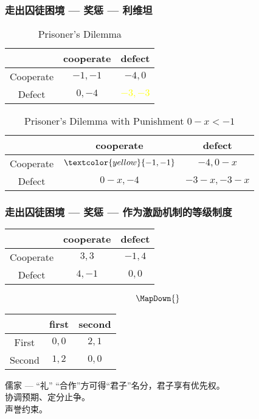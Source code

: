 \documentclass[UTF8,11pt,colorlinks,compress,openany]{beamer}%
\begin{document}
\begin{frame}\frametitle{走出囚徒困境 --- 奖惩 --- 利维坦}
\begin{table}
\abovetabulinesep=1mm
\belowtabulinesep=1mm
\begin{tabu}{c|cc}
\hline
 & cooperate & defect\\
\hline
Cooperate & $-1,-1$ & $-4,0$\\
Defect & $0,-4$ &\textcolor{yellow}{$-3,-3$}\\
\hline
\end{tabu}\caption{Prisoner's Dilemma}
\end{table}
\begin{table}
\abovetabulinesep=1mm
\belowtabulinesep=1mm
\begin{tabu}{c|cc}
\hline
 & cooperate & defect\\
\hline
Cooperate & $\textcolor{yellow}{-1,-1}$ & $-4,0-x$\\
Defect & $0-x,-4$ &$-3-x,-3-x$\\
\hline
\end{tabu}\caption{Prisoner's Dilemma with Punishment $0-x<-1$}
\end{table}	
\end{frame}

\begin{frame}\frametitle{走出囚徒困境 --- 奖惩 --- 作为激励机制的等级制度}
\begin{table}
\begin{tabu}{c|cc}
\hline
 & cooperate & defect\\
\hline
Cooperate & $3,3$ & $-1,4$\\
Defect & $4,-1$ & $0,0$\\
\hline
\end{tabu}
\[\MapDown{}\]
\begin{tabu}{c|cc}
\hline
 & first & second\\
\hline
First & $0,0$ & $2,1$\\
Second & $1,2$ & $0,0$\\
\hline
\end{tabu}
\end{table}
\begin{block}{儒家 --- “礼”}
“合作”方可得“君子”名分，君子享有优先权。\\
协调预期、定分止争。\\
声誉约束。
\end{block}
\end{frame}
\end{document}
